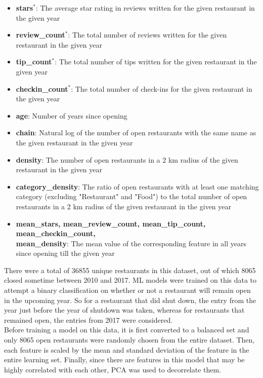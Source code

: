 \documentclass[12pt]{article}
\begin{document}
  \begin{itemize}
    \item \textbf{stars$^*$}: The average star rating in reviews written for the given restaurant in the given year
    \item \textbf{review\_count$^*$}: The total number of reviews written for the given restaurant in the given year
    \item \textbf{tip\_count$^*$}: The total number of tips written for the given restaurant in the given year
    \item \textbf{checkin\_count$^*$}: The total number of check-ins for the given restaurant in the given year
    \item \textbf{age}: Number of years since opening
    \item \textbf{chain}: Natural log of the number of open restaurants with the same name as the given restaurant in the given year
    \item \textbf{density}: The number of open restaurants in a 2 km radius of the given restaurant in the given year
    \item \textbf{category\_density}: The ratio of open restaurants with at least one matching category (excluding "Restaurant" and "Food") to the total number of open restaurants in a 2 km radius of the given restaurant in the given year
    \item \textbf{mean\_stars, mean\_review\_count, mean\_tip\_count, mean\_checkin\_count,\\ mean\_density}: The mean value of the corresponding feature in all years since opening till the given year
  \end{itemize}

  There were a total of 36855 unique restaurants in this dataset, out of which 8065 closed sometime between 2010 and 2017. ML models were trained on this data to attempt a binary classification on whether or not a restaurant will remain open in the upcoming year. So for a restaurant that did shut down, the entry from the year just before the year of shutdown was taken, whereas for restaurants that remained open, the entries from 2017 were considered.\\

  Before training a model on this data, it is first converted to a balanced set and only 8065 open restaurants were randomly chosen from the entire dataset. Then, each feature is scaled by the mean and standard deviation of the feature in the entire learning set. Finally, since there are features in this model that may be highly correlated with each other, PCA was used to decorrelate them.
\end{document}
